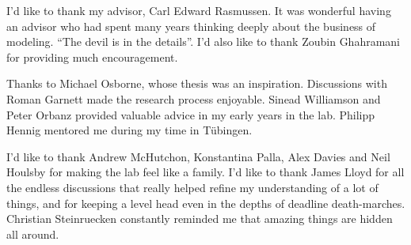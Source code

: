 
\begin{acknowledgements}      


I'd like to thank my advisor, Carl Edward Rasmussen.  It was wonderful having an advisor who had spent many years thinking deeply about the business of modeling. ``The devil is in the details''.
I'd also like to thank Zoubin Ghahramani for providing much encouragement.

Thanks to Michael Osborne, whose thesis was an inspiration.  Discussions with Roman Garnett made the research process enjoyable.
Sinead Williamson and Peter Orbanz provided valuable advice in my early years in the lab.
Philipp Hennig mentored me during my time in T\"{u}bingen.

I'd like to thank Andrew McHutchon, Konstantina Palla, Alex Davies and Neil Houlsby for making the lab feel like a family.
I'd like to thank James Lloyd for all the endless discussions that really helped refine my understanding of a lot of things, and for keeping a level head even in the depths of deadline death-marches.
Christian Steinruecken constantly reminded me that amazing things are hidden all around.

\end{acknowledgements}
